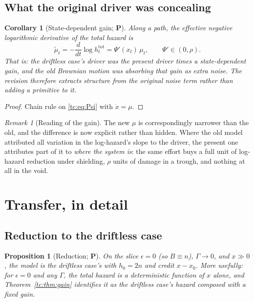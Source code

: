 \documentclass[11pt]{article}
\numberwithin{equation}{section}
\theoremstyle{plain}
\newtheorem{proposition}[theorem]{Proposition}
\newtheorem{corollary}[theorem]{Corollary}
\theoremstyle{definition}
\theoremstyle{remark}
\newtheorem{remark}[theorem]{Remark}
\begin{document}
\subsection{What the original driver was concealing}
\label{tc:subsub:concealed}

\begin{corollary}[State-dependent gain; \textbf{P}]
\label{tc:cor:concealed}
Along a path, the effective negative logarithmic derivative of the total
hazard is
\begin{equation}\label{tc:eq:effmu}
\tilde\mu_t=-\frac{d}{dt}\log h^{\mathrm{tot}}_t
=\Psi'(x_t)\,\mu_t,
\qquad \Psi'\in(0,\rho).
\end{equation}
That is: \emph{the driftless case's driver was the present driver times a
state-dependent gain}, and the old Brownian motion was absorbing that
gain as extra noise. The revision therefore extracts structure from the
original noise term rather than adding a primitive to it.
\end{corollary}

\begin{proof}
Chain rule on \eqref{tc:eq:Psi} with $\dot x=\mu$.
\end{proof}

\begin{remark}[Reading of the gain]\label{tc:rem:gainreading}
The new $\mu$ is correspondingly narrower than the old, and the
difference is now explicit rather than hidden. Where the old model
attributed all variation in the log-hazard's slope to the driver, the
present one attributes part of it to \emph{where the system is}: the
same effort buys a full unit of log-hazard reduction under shielding,
$\rho$ units of damage in a trough, and nothing at all in the void.
\end{remark}

\section{Transfer, in detail}\label{app:transfer}

\subsection{Reduction to the driftless case}\label{tc:subsub:reduction}

\begin{proposition}[Reduction; \textbf{P}]\label{tc:prop:reduction}
On the slice $\epsilon=0$ (so $B\equiv n$), $\Gamma\to0$, and $x\gg0$,
the model is the driftless case's with $h_0=2n$ and credit $x-x_0$. More
usefully: for $\epsilon=0$ and any $\Gamma$, the total hazard is a
deterministic function of $x$ alone, and Theorem~\ref{tc:thm:gain}
identifies it as the driftless case's hazard composed with a fixed gain.
\end{proposition}
\end{document}
